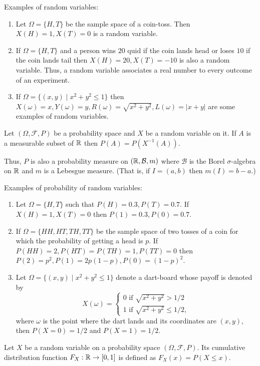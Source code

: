 \documentclass{article}
\begin{document}
Examples of random variables:
\begin{enumerate}
\item Let $\Omega = \{H, T\}$ be the sample space of a coin-toss. Then $X(H)=1,
X(T)=0$ is a random variable.
\item If $\Omega = \{H, T\}$ and a person wins $20$ quid if the coin lands head
or loses $10$ if the coin lands tail then $X(H) = 20, X(T) = -10$ is also a 
random variable. Thus, a random variable associates a real number to every 
outcome of an experiment.
\item If $\Omega = \{(x, y) \;|\; x^2 + y^2 \le 1\}$ then $X(\omega) = x, Y(
\omega) = y, R(\omega) = \sqrt{x^2 + y^2}, L(\omega) = |x + y|$ are some examples
of random variables.
\end{enumerate}

\begin{defn}\label{c2d5}
Let $(\Omega, \mathcal{F}, P)$ be a probability space and $X$ be a random variable
on it. If $A$ is a measurable subset of $\mathbb{R}$ then $P(A) = P(X^{-1}(A))$.
\end{defn}

Thus, $P$ is also a probability measure on $(\mathbb{R}, \mathcal{B}, m)$ where 
$\mathcal{B}$ is the Borel $\sigma$-algebra on $\mathbb{R}$ and $m$ is a Lebesgue 
measure. (That is, if $I = (a, b)$ then $m(I) = b - a$.)

Examples of probability of random variables:
\begin{enumerate}
\item Let $\Omega = \{H, T\}$ such that $P(H) = 0.3, P(T) = 0.7$. If $X(H)=1,
X(T)=0$ then $P(1) = 0.3, P(0) = 0.7$.
\item If $\Omega = \{HH, HT, TH, TT\}$ be the sample space of two tosses of a
coin for which the probability of getting a head is $p$. If $P(HH) = 2, P(HT) = 
P(TH) = 1, P(TT) = 0$ then $P(2) = p^2, P(1) = 2p(1-p),P(0) = (1 - p)^2$.
\item Let $\Omega = \{(x, y) \;|\; x^2 + y^2 \le 1\}$ denote a dart-board whose
payoff is denoted by 
\[
X(\omega) = \begin{cases}
0 \text{ if } \sqrt{x^2 + y^2} > 1/2 \\
1 \text{ if } \sqrt{x^2 + y^2} \le 1/2,
\end{cases}
\]
where $\omega$ is the point where the dart lands and its coordinates are 
$(x, y)$, then $P(X = 0) = 1/2$ and $P(X = 1) = 1/2$.
\end{enumerate}

\begin{defn}\label{c2d6}
Let $X$ be a random variable on a probability space $(\Omega, \mathcal{F}, P)$.
Its cumulative distribution function $F_X: \mathbb{R} \rightarrow [0, 1]$ is defined
as $F_X(x) = P(X \le x)$.
\end{defn}
\end{document}
